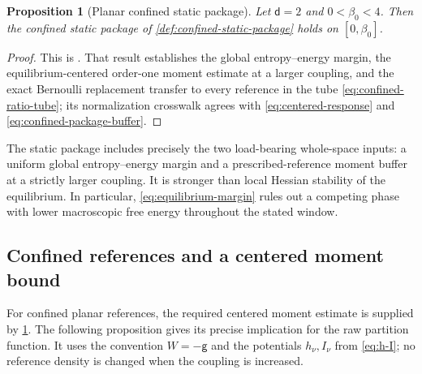 \documentclass[11pt,reqno]{amsart}
\numberwithin{equation}{section}
\newtheorem{proposition}[proposition]{Proposition}
\theoremstyle{definition}
\theoremstyle{remark}
\newcommand{\g}{\mathsf g}
\renewcommand{\d}{\mathsf d}
\begin{document}
\begin{proposition}[Planar confined static package]\label{prop:planar-confined-static-package}
Let $\d=2$ and $0<\beta_0<4$. Then the confined static package of \cref{def:confined-static-package} holds on $[0,\beta_0]$.
\end{proposition}
\begin{proof}
This is \cite[Theorem~9.1 and Appendix~G]{PartI}. That result establishes the global entropy--energy margin, the equilibrium-centered order-one moment estimate at a larger coupling, and the exact Bernoulli replacement transfer to every reference in the tube \eqref{eq:confined-ratio-tube}; its normalization crosswalk agrees with \eqref{eq:centered-response} and \eqref{eq:confined-package-buffer}.
\end{proof}

The static package includes precisely the two load-bearing whole-space inputs: a uniform global entropy--energy margin and a prescribed-reference moment buffer at a strictly larger coupling. It is stronger than local Hessian stability of the equilibrium. In particular, \eqref{eq:equilibrium-margin} rules out a competing phase with lower macroscopic free energy throughout the stated window.

\subsection{Confined references and a centered moment bound}\label{subsec:confined-static-transfer}

For confined planar references, the required centered moment estimate is supplied by \cref{prop:planar-confined-static-package}. The following proposition gives its precise implication for the raw partition function. It uses the convention $W=-\g$ and the potentials $h_\nu,I_\nu$ from \eqref{eq:h-I}; no reference density is changed when the coupling is increased.
\end{document}
